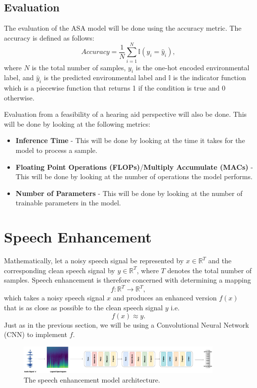 \documentclass[logo,bsc,singlespacing,parskip,online]{infthesis}
\begin{document}
\subsection{Evaluation}
The evaluation of the ASA model will be done using the accuracy metric. The accuracy is defined as follows:
\[
Accuracy = \frac{1}{N} \sum_{i=1}^{N} \mathbb{I}(y_i = \hat{y}_i),
\]
where \(N\) is the total number of samples, \(y_i\) is the one-hot encoded environmental label, and \(\hat{y}_i\) is the predicted environmental label
and \(\mathbb{I}\) is the indicator function which is a piecewise function that returns 1 if the condition is true and 0 otherwise.

Evaluation from a feasibility of a hearing aid perspective will also be done. 
This will be done by looking at the following metrics:
\begin{itemize}
   \item \textbf{Inference Time} - This will be done by looking at the time it takes for the model to process a sample.
   \item \textbf{Floating Point Operations (FLOPs)}/\textbf{Multiply Accumulate (MACs)} - This will be done by looking at the number of operations the model performs.
   \item \textbf{Number of Parameters} - This will be done by looking at the number of trainable parameters in the model.
\end{itemize}

\section{Speech Enhancement}
Mathematically, let a noisy speech signal be represented by \(x \in \mathbb{R}^{T}\) and the corresponding clean speech signal by \(y \in \mathbb{R}^{T}\), where \(T\) denotes the total number of samples.
Speech enhancement is therefore concerned with determining a mapping 
\[
f: \mathbb{R}^{T} \to \mathbb{R}^{T},
\]
which takes a noisy speech signal \(x\) and produces an enhanced version \(f(x)\) that is as close as possible to the clean speech signal \(y\) i.e.
\[
f(x) \approx y.
\]
Just as in the previous section, we will be using a Convolutional Neural Network (CNN) to implement \(f\).
\begin{figure}[h]
   \centering
   \includegraphics[width=0.9\textwidth]{se-model-diagram.png}
   \caption{The speech enhancement model architecture.}
   \label{fig:speech-enhancement-model-architecture}
\end{figure}
\end{document}
